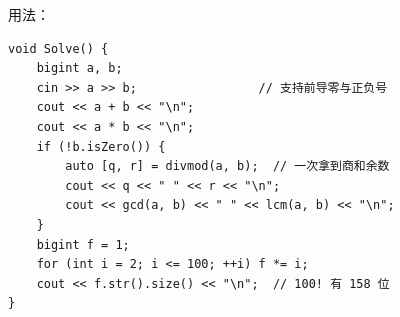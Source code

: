 		用法：

		\begin{verbatim}
void Solve() {
    bigint a, b;
    cin >> a >> b;                 // 支持前导零与正负号
    cout << a + b << "\n";
    cout << a * b << "\n";
    if (!b.isZero()) {
        auto [q, r] = divmod(a, b);  // 一次拿到商和余数
        cout << q << " " << r << "\n";
        cout << gcd(a, b) << " " << lcm(a, b) << "\n";
    }
    bigint f = 1;
    for (int i = 2; i <= 100; ++i) f *= i;
    cout << f.str().size() << "\n";  // 100! 有 158 位
}
		\end{verbatim}

	\newpage
